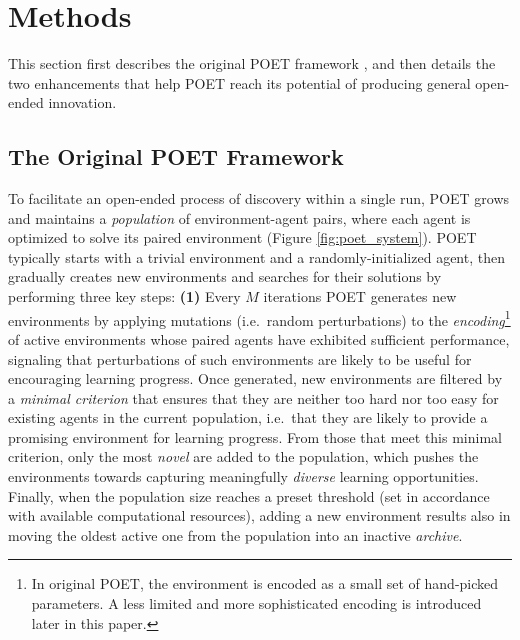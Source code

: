 \documentclass{article}
\begin{document}
\section{Methods}
\label{methods}

This section first describes the original POET framework \cite{wang2019paired,wang2019poetGECCO}, and then details the two enhancements that help POET reach its potential of producing general open-ended innovation. 

\subsection{The Original POET Framework}
\label{overview_poet_framework}

To facilitate an open-ended process of discovery within a single run, POET grows and maintains a \emph{population} of environment-agent pairs, where each agent is optimized to solve its paired environment (Figure \ref{fig:poet_system}). POET typically starts with a trivial environment and a randomly-initialized agent, then gradually creates new environments and searches for their solutions by performing three key steps: 
\textbf{(1)} Every $M$ iterations POET generates new environments by applying mutations (i.e.\ random perturbations) to the \emph{encoding}\footnote{In original POET, the environment is encoded as a small set of hand-picked parameters. A less limited and more sophisticated encoding is introduced later in this paper.} of active environments whose paired agents have exhibited sufficient performance, signaling that perturbations of such environments are likely to be useful for encouraging learning progress. Once generated, new environments are filtered by a \emph{minimal criterion} \cite{brant:mcc17} that ensures that they are neither too hard nor too easy for existing agents in the current population, i.e.\ that they are likely to provide a promising environment for learning progress. From those that meet this minimal criterion, only the most \emph{novel} are added to the population, which pushes the environments towards capturing meaningfully \emph{diverse} learning opportunities. 
Finally, when the population size reaches a preset threshold (set in accordance with available computational resources), adding a new environment results also in moving the oldest active one from the population into an inactive \emph{archive}.  
\end{document}
